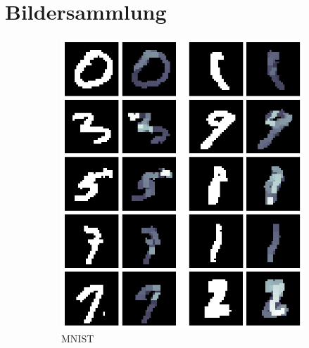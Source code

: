 \section{Bildersammlung}
\label{sub:r_bild}
\begin{figure}[!ht]
    \centering
    \begin{subfigure}[b]{0.3\textwidth}
        \centering
        \includegraphics[width=\textwidth]{images/resultate/base-base-mnist.png}
        \caption{MNIST}
    \end{subfigure}
    \begin{subfigure}[b]{0.3\textwidth}
        \centering

\end{subfigure}
\end{figure}
